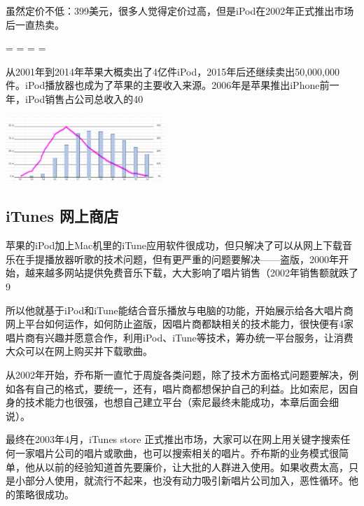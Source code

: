 虽然定价不低：399美元，很多人觉得定价过高，但是iPod在2002年正式推出市场后一直热卖。

\begin{description}
\tightlist
\item[]
= = = =
\end{description}

从2001年到2014年苹果大概卖出了4亿件iPod，2015年后还继续卖出50,000,000件。iPod播放器也成为了苹果的主要收入来源。2006年是苹果推出iPhone前一年，iPod销售占公司总收入的40%


\includegraphics[width=6cm]{AppleRiseFallDrawScreenshot_2023-12-06_211749.jpg}

\hypertarget{itunes-ux7f51ux4e0aux5546ux5e97}{%
\subsection{iTunes 网上商店}\label{itunes-ux7f51ux4e0aux5546ux5e97}}

苹果的iPod加上Mac机里的iTune应用软件很成功，但只解决了可以从网上下载音乐在手提播放器听歌的技术问题，但有更严重的问题要解决——盗版，2000年开始，越来越多网站提供免费音乐下载，大大影响了唱片销售（2002年销售额就跌了9%

所以他就基于iPod和iTune能结合音乐播放与电脑的功能，开始展示给各大唱片商网上平台如何运作，如何防止盗版，因唱片商都缺相关的技术能力，很快便有4家唱片商有兴趣并愿意合作，利用iPod、iTune等技术，筹办统一平台服务，让消费大众可以在网上购买并下载歌曲。

从2002年开始，乔布斯一直忙于周旋各类问题，除了技术方面格式问题要解决，例如各有自己的格式，要统一，还有，唱片商都想保护自己的利益。比如索尼，因自身的技术能力也很强，也想自己建立平台（索尼最终未能成功，本章后面会细说）。

最终在2003年4月，iTunes store 正式推出市场，大家可以在网上用关键字搜索任何一家唱片公司的唱片或歌曲，也可以搜索相关的唱片。乔布斯的业务模式很简单，他从以前的经验知道首先要廉价，让大批的人群进入使用。如果收费太高，只是小部分人使用，就流行不起来，也没有动力吸引新唱片公司加入，恶性循环。他的策略很成功。

